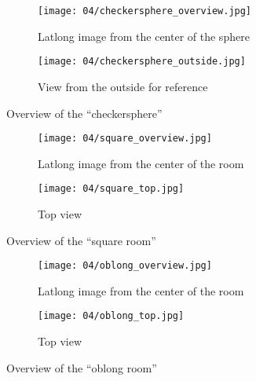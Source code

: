 \begin{figure}[p]
\centering
    \hfill
    \begin{subfigure}[t]{0.7\textwidth}
            \centering
            \texttt{[image: 04/checkersphere\_overview.jpg]}
            \caption{Latlong image from the center of the sphere}
    \end{subfigure}%
    \hfill
    \begin{subfigure}[t]{0.3\textwidth}
            \centering
            \texttt{[image: 04/checkersphere\_outside.jpg]}
            \caption{View from the outside for reference}
    \end{subfigure}
    \hfill
  \caption{Overview of the ``checkersphere''}
  \label{fig:checkersphere}
\end{figure}

\begin{figure}[p]
\centering
    \hfill
    \begin{subfigure}[b]{0.7\textwidth}
            \centering
            \texttt{[image: 04/square\_overview.jpg]}
            \caption{Latlong image from the center of the room}
    \end{subfigure}%
    \hfill
    \begin{subfigure}[b]{0.3\textwidth}
            \centering
            \texttt{[image: 04/square\_top.jpg]}
            \caption{Top view}
    \end{subfigure}
    \hfill
  \caption{Overview of the ``square room''}
  \label{fig:square_room}
\end{figure}

\begin{figure}[p]
\centering
    \hfill
    \begin{subfigure}[b]{0.7\textwidth}
            \centering
            \texttt{[image: 04/oblong\_overview.jpg]}
            \caption{Latlong image from the center of the room}
    \end{subfigure}%
    \hfill
    \begin{subfigure}[b]{0.3\textwidth}
            \centering
            \texttt{[image: 04/oblong\_top.jpg]}
            \caption{Top view}
    \end{subfigure}
    \hfill
  \caption{Overview of the ``oblong room''}
  \label{fig:oblong_room}
\end{figure}


